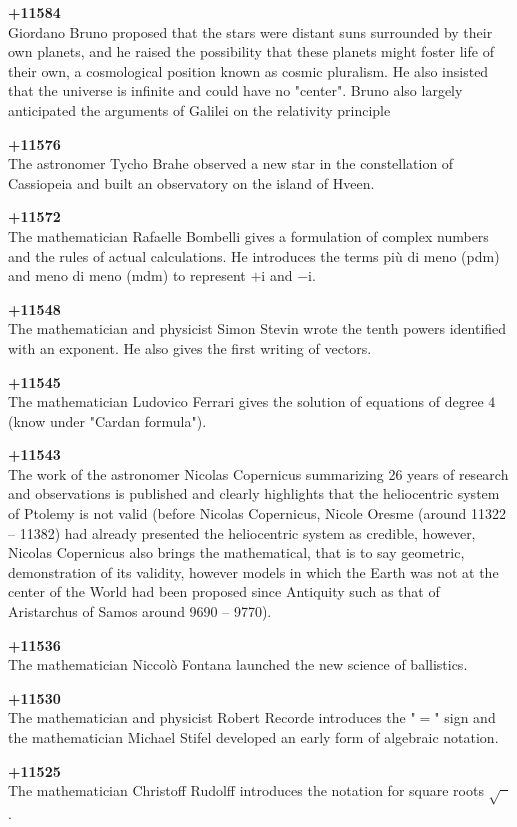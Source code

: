 \textbf{+11584}\\
Giordano Bruno proposed that the stars were distant suns surrounded by their own planets, and he raised the possibility that these planets might foster life of their own, a cosmological position known as cosmic pluralism. He also insisted that the universe is infinite and could have no "center". Bruno also largely anticipated the arguments of Galilei on the relativity principle

\textbf{+11576}\\
The astronomer Tycho Brahe observed a new star in the constellation of Cassiopeia and built an observatory on the island of Hveen.

\textbf{+11572}\\
The mathematician Rafaelle Bombelli gives a formulation of complex numbers and the rules of actual calculations. He introduces the terms più di meno (pdm) and meno di meno (mdm) to represent $+\mathrm{i}$ and $-\mathrm{i}$.

\textbf{+11548}\\
The mathematician and physicist Simon Stevin wrote the tenth powers identified with an exponent. He also gives the first writing of vectors. 

\textbf{+11545}\\
The mathematician Ludovico Ferrari gives the solution of equations of degree $4$ (know under "Cardan formula").

\textbf{+11543}\\
The work of the astronomer Nicolas Copernicus summarizing 26 years of research and observations is published and clearly highlights that the heliocentric system of Ptolemy is not valid (before Nicolas Copernicus, Nicole Oresme (around 11322 – 11382) had already presented the heliocentric system as credible, however, Nicolas Copernicus also brings the mathematical, that is to say geometric, demonstration of its validity, however models in which the Earth was not at the center of the World had been proposed since Antiquity such as that of Aristarchus of Samos around 9690 – 9770).

\textbf{+11536}\\
The mathematician Niccolò Fontana launched the new science of ballistics.

\textbf{+11530}\\
The mathematician and physicist Robert Recorde introduces the "$=$" sign and the mathematician Michael Stifel developed an early form of algebraic notation.

\textbf{+11525}\\
The mathematician Christoff Rudolff introduces the notation for square roots $\sqrt{\phantom{a}}$.

